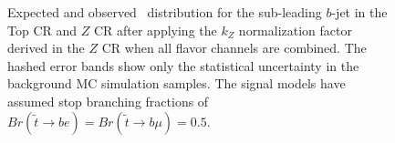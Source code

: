 \begin{figure}[p]
  \centering
  \caption[
    Expected and observed \pt\ distribution for the sub-leading $b$-jet
    in the Top CR and $Z$ CR after applying the $k_Z$ normalization factor
    derived in the $Z$ CR when all flavor channels are combined.
  ]{
    Expected and observed \pt\ distribution for the sub-leading $b$-jet
    in the Top CR and $Z$ CR after applying the $k_Z$ normalization factor
    derived in the $Z$ CR when all flavor channels are combined.
    The hashed error bands show only the statistical uncertainty in the
    background MC simulation samples.
    The signal models have assumed stop branching fractions of
    $Br(\tilde{t}\rightarrow be) = Br(\tilde{t}\rightarrow b\mu) = 0.5$.
  }
  \label{fig:cr_b_jet_pt_1__w_norm_factor}
\end{figure}

